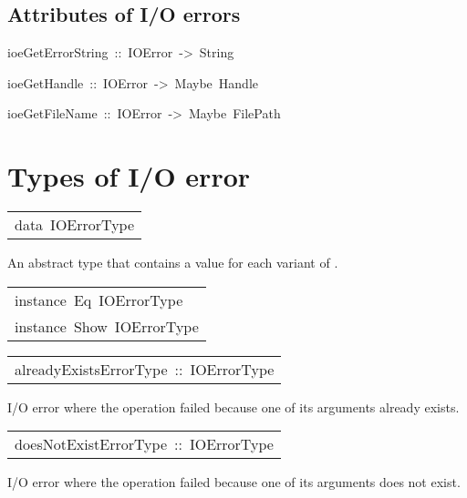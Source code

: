 \subsection{Attributes of I/O errors
}
\begin{haddockdesc}
\item[
ioeGetErrorString\ ::\ IOError\ ->\ String
]
\item[
ioeGetHandle\ ::\ IOError\ ->\ Maybe\ Handle
]
\item[
ioeGetFileName\ ::\ IOError\ ->\ Maybe\ FilePath
]
\end{haddockdesc}
\section{Types of I/O error
}
\begin{haddockdesc}
\item[\begin{tabular}{@{}l}
data\ IOErrorType
\end{tabular}]\haddockbegindoc
An abstract type that contains a value for each variant of .
\par

\end{haddockdesc}
\begin{haddockdesc}
\item[\begin{tabular}{@{}l}
instance\ Eq\ IOErrorType\\instance\ Show\ IOErrorType
\end{tabular}]
\end{haddockdesc}
\begin{haddockdesc}
\item[\begin{tabular}{@{}l}
alreadyExistsErrorType\ ::\ IOErrorType
\end{tabular}]\haddockbegindoc
I/O error where the operation failed because one of its arguments
 already exists.
\par

\end{haddockdesc}
\begin{haddockdesc}
\item[\begin{tabular}{@{}l}
doesNotExistErrorType\ ::\ IOErrorType
\end{tabular}]\haddockbegindoc
I/O error where the operation failed because one of its arguments
 does not exist.
\par

\end{haddockdesc}
